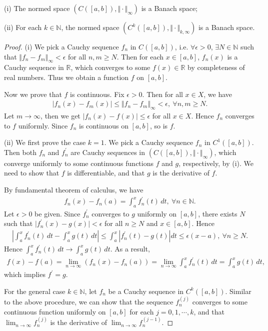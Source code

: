 \documentclass{article}
\begin{document}
(i) The normed space $(C([a,b]),\Vert\cdot\Vert_\infty)$ is a Banach space; 

(ii) For each $k\in\mathbb{N}$, the normed space $(C^k([a,b]),\Vert\cdot\Vert_{k,\infty})$ is a Banach space.

\begin{proof}
(i) We pick a Cauchy sequence $f_n$ in $C([a,b])$, i.e. $\forall \epsilon>0$, $\exists N\in\mathbb{N}$ such that $\Vert f_n-f_m\Vert_\infty <\epsilon$ for all $n,m\geq N$. Then for each $x\in[a,b]$, $f_n(x)$ is a Cauchy sequence in $\mathbb{R}$, which converges to some $f(x)\in\mathbb{R}$ by completeness of real numbers. Thus we obtain a function $f$ on $[a,b]$.

Now we prove that $f$ is continuous. Fix $\epsilon>0$. Then for all $x\in X$, we have
\begin{align*}
	\vert f_n(x) - f_m(x)\vert \leq \Vert f_n - f_m\Vert_\infty < \epsilon,\ \forall n,m\geq N.
\end{align*}
Let $m\to\infty$, then we get $\vert f_n(x)-f(x)\vert \leq \epsilon$ for all $x\in X$. Hence $f_n$ converges to $f$ uniformly. Since $f_n$ is continuous on $[a,b]$, so is $f$.
\vspace{0.12cm}

(ii) We first prove the case $k=1$. We pick a Cauchy sequence $f_n$ in $C^1([a,b])$. Then both $f_n$ and $f_n^\prime$ are Cauchy sequences in $(C([a,b]),\Vert\cdot\Vert_\infty)$, which converge uniformly to some continuous functions $f$ and $g$, respectively, by (i). We need to show that $f$ is differentiable, and that $g$ is the derivative of $f$.

By fundamental theorem of calculus, we have
\begin{align*}
	f_n(x) - f_n(a) = \int_a^x f_n^\prime(t)\,dt,\ \forall n\in\mathbb{N}.
\end{align*}
Let $\epsilon>0$ be given. Since $f_n^\prime$ converges to $g$ uniformly on $[a,b]$, there exists $N$ such that $\vert f_n^\prime(x) - g(x)\vert <\epsilon$ for all $n\geq N$ and $x\in [a,b]$. Hence
\begin{align*}
	\left\vert \int_a^x f_n^\prime(t)\,dt - \int_a^x g(t)\,dt\right\vert \leq  \int_a^x \left\vert f_n^\prime(t)-g(t)\right\vert dt \leq \epsilon(x-a),\ \forall n\geq N.
\end{align*}
Hence $\int_a^x f_n^\prime(t)\,dt \to \int_a^x g(t)\,dt$. As a result,
\begin{align*}
	f(x) - f(a) = \lim_{n\to\infty} \left(f_n(x) - f_n(a)\right) = \lim_{n\to\infty} \int_a^x f_n^\prime(t)\,dt = \int_a^x g(t)\,dt,
\end{align*}
which implies $f^\prime=g$.

For the general case $k\in\mathbb{N}$, let $f_n$ be a Cauchy sequence in $C^k([a,b])$. Similar to the above procedure, we can show that the sequence $f_n^{(j)}$ converges to some continuous function uniformly on $[a,b]$ for each $j=0,1,\cdots,k$, and that $\lim_{n\to\infty} f_n^{(j)}$ is the derivative of $\lim_{n\to\infty} f_n^{(j-1)}$.
\end{proof}
\end{document}
